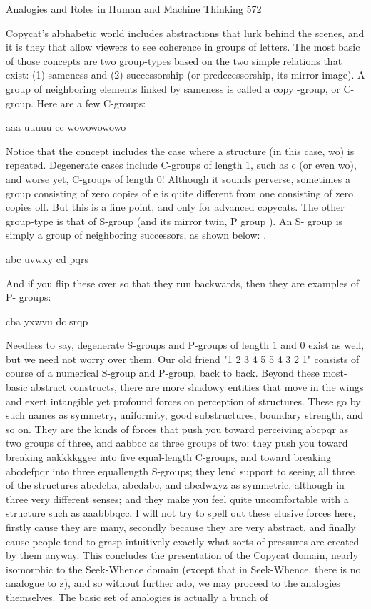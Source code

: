 Analogies and Roles in Human and Machine Thinking                                    572

        Copycat's alphabetic world includes abstractions that lurk behind the scenes,
and it is they that allow viewers to see coherence in groups of letters. The most basic
of those concepts are two group-types based on the two simple relations that exist: (1)
sameness and (2) successorship (or predecessorship, its mirror image). A group of
neighboring elements linked by sameness is called a copy -group, or C-group. Here
are a few C-groups:

               aaa uuuuu cc wowowowowo

Notice that the concept includes the case where a structure (in this case, wo) is
repeated. Degenerate cases include C-groups of length 1, such as c (or even wo), and
worse yet, C-groups of length 0! Although it sounds perverse, sometimes a group
consisting of zero copies of e is quite different from one consisting of zero copies off.
But this is a fine point, and only for advanced copycats.
        The other group-type is that of S-group (and its mirror twin, P group ). An S-
group is simply a group of neighboring successors, as shown below: .

               abc uvwxy cd pqrs

And if you flip these over so that they run backwards, then they are examples of P-
groups:

       cba yxwvu dc srqp

Needless to say, degenerate S-groups and P-groups of length 1 and 0 exist as well, but
we need not worry over them. Our old friend "1 2 3 4 5 5 4 3 2 1" consists of course
of a numerical S-group and P-group, back to back.
Beyond these most-basic abstract constructs, there are more shadowy entities that
move in the wings and exert intangible yet profound forces on perception of
structures. These go by such names as symmetry, uniformity, good substructures,
boundary strength, and so on. They are the kinds of forces that push you toward
perceiving abcpqr as two groups of three, and aabbcc as three groups of two; they
push you toward breaking aakkkkggee into five equal-length C-groups, and toward
breaking abcdefpqr into three equallength S-groups; they lend support to seeing all
three of the structures abcdcba, abcdabc, and abcdwxyz as symmetric, although in
three very different senses; and they make you feel quite uncomfortable with a
structure such as aaabbbqcc. I will not try to spell out these elusive forces here, firstly
cause they are many, secondly because they are very abstract, and finally cause
people tend to grasp intuitively exactly what sorts of pressures are created by them
anyway.
This concludes the presentation of the Copycat domain, nearly isomorphic to the
Seek-Whence domain (except that in Seek-Whence, there is no analogue to z), and so
without further ado, we may proceed to the analogies themselves. The basic set of
analogies is actually a bunch of




